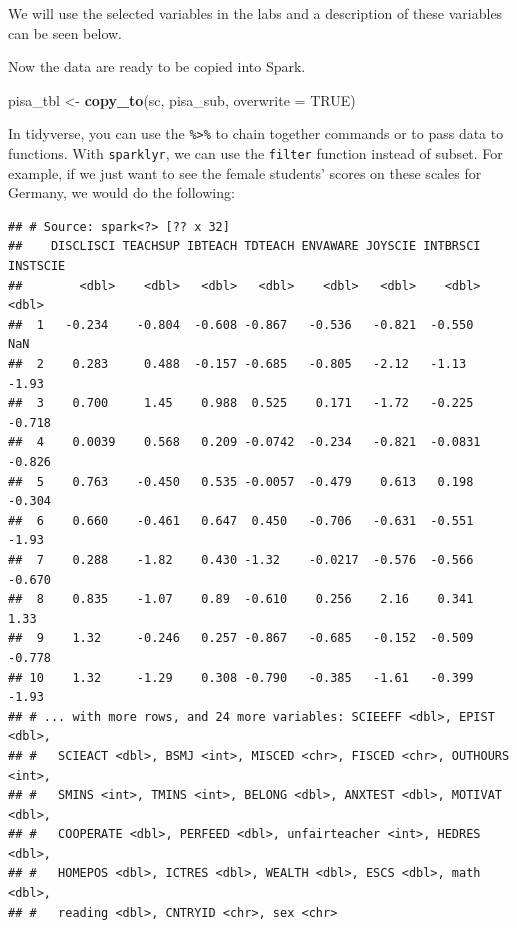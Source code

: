 \documentclass[]{book}
\newenvironment{Shaded}{\begin{snugshade}}{\end{snugshade}}
\newcommand{\DataTypeTok}[1]{\textcolor[rgb]{0.13,0.29,0.53}{#1}}
\newcommand{\KeywordTok}[1]{\textcolor[rgb]{0.13,0.29,0.53}{\textbf{#1}}}
\newcommand{\NormalTok}[1]{#1}
\newcommand{\OperatorTok}[1]{\textcolor[rgb]{0.81,0.36,0.00}{\textbf{#1}}}
\newcommand{\OtherTok}[1]{\textcolor[rgb]{0.56,0.35,0.01}{#1}}
\newcommand{\StringTok}[1]{\textcolor[rgb]{0.31,0.60,0.02}{#1}}
\begin{document}
We will use the selected variables in the labs and a description of these variables can be seen below.

Now the data are ready to be copied into Spark.

\begin{Shaded}
\begin{Highlighting}[]
\NormalTok{pisa_tbl <-}\StringTok{ }\KeywordTok{copy_to}\NormalTok{(sc, pisa_sub, }\DataTypeTok{overwrite =} \OtherTok{TRUE}\NormalTok{)}
\end{Highlighting}
\end{Shaded}

In tidyverse, you can use the \texttt{\%\textgreater{}\%} to chain together commands or to pass data to functions. With \texttt{sparklyr}, we can use the \texttt{filter} function instead of subset. For example, if we just want to see the female students' scores on these scales for Germany, we would do the following:

\begin{Shaded}
\end{Shaded}

\begin{verbatim}
## # Source: spark<?> [?? x 32]
##    DISCLISCI TEACHSUP IBTEACH TDTEACH ENVAWARE JOYSCIE INTBRSCI INSTSCIE
##        <dbl>    <dbl>   <dbl>   <dbl>    <dbl>   <dbl>    <dbl>    <dbl>
##  1   -0.234    -0.804  -0.608 -0.867   -0.536   -0.821  -0.550   NaN    
##  2    0.283     0.488  -0.157 -0.685   -0.805   -2.12   -1.13     -1.93 
##  3    0.700     1.45    0.988  0.525    0.171   -1.72   -0.225    -0.718
##  4    0.0039    0.568   0.209 -0.0742  -0.234   -0.821  -0.0831   -0.826
##  5    0.763    -0.450   0.535 -0.0057  -0.479    0.613   0.198    -0.304
##  6    0.660    -0.461   0.647  0.450   -0.706   -0.631  -0.551    -1.93 
##  7    0.288    -1.82    0.430 -1.32    -0.0217  -0.576  -0.566    -0.670
##  8    0.835    -1.07    0.89  -0.610    0.256    2.16    0.341     1.33 
##  9    1.32     -0.246   0.257 -0.867   -0.685   -0.152  -0.509    -0.778
## 10    1.32     -1.29    0.308 -0.790   -0.385   -1.61   -0.399    -1.93 
## # ... with more rows, and 24 more variables: SCIEEFF <dbl>, EPIST <dbl>,
## #   SCIEACT <dbl>, BSMJ <int>, MISCED <chr>, FISCED <chr>, OUTHOURS <int>,
## #   SMINS <int>, TMINS <int>, BELONG <dbl>, ANXTEST <dbl>, MOTIVAT <dbl>,
## #   COOPERATE <dbl>, PERFEED <dbl>, unfairteacher <int>, HEDRES <dbl>,
## #   HOMEPOS <dbl>, ICTRES <dbl>, WEALTH <dbl>, ESCS <dbl>, math <dbl>,
## #   reading <dbl>, CNTRYID <chr>, sex <chr>
\end{verbatim}
\end{document}
